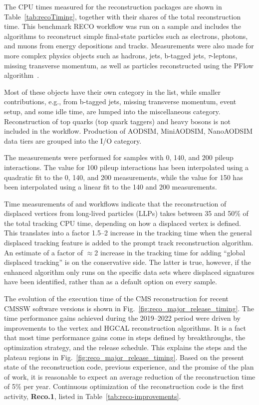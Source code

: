 The \gls{CPU} times measured for the \PhaseTwo reconstruction packages are shown in Table~\ref{tab:recoTiming}, together with their shares of the total reconstruction time. This benchmark \gls{RECO} workflow was run on a \ttbar sample and includes the algorithms to reconstruct simple final-state particles such as electrons, photons, and muons from energy depositions and tracks. Measurements were also made for more complex physics objects such as hadrons, jets, b-tagged jets, $\tau$-leptons, missing transverse momentum, as well as particles reconstructed using the \gls{PFlow} algorithm~\cite{CMS:2017yfk}.

Most of these objects have their own category in the list, while smaller contributions, e.g., from b-tagged jets, missing transverse momentum, event setup, and some idle time, are lumped into the miscellaneous category. Reconstruction of top quarks (top quark taggers) and heavy bosons is not included in the workflow. Production of \gls{AOD}\gls{SIM}, Mini\gls{AOD}\gls{SIM}, Nano\gls{AOD}\gls{SIM} data tiers are grouped into the I/O category.

The measurements were performed for samples with 0, 140, and 200 pileup interactions. The value for 100 pileup interactions has been interpolated using a quadratic fit to the 0, 140, and 200 measurements, while the value for 150 has been interpolated using a linear fit to the 140 and 200 measurements.

Time measurements of \RunTwo and \RunThree workflows indicate that the reconstruction of displaced vertices from long-lived particles (LLPs) takes between 35 and 50\% of the total tracking \gls{CPU} time, depending on how a displaced vertex is defined. This translates into a factor 1.5--2 increase in the tracking time when the general displaced tracking feature is added to the prompt track reconstruction algorithm. An estimate of a factor of $\approx$2 increase in the \PhaseTwo tracking time for adding ``global displaced tracking'' is on the conservative side. The latter is true, however, if the enhanced algorithm only runs on the specific data sets where displaced signatures have been identified, rather than as a default option on every sample.

The evolution of the execution time of the \PhaseTwo CMS reconstruction for recent \gls{CMSSW} software versions is shown in Fig.~\ref{fig:reco_major_release_timing}. The time performance gains achieved during the 2019--2022 period were driven by improvements to the vertex and \gls{HGCAL} reconstruction algorithms. It is a fact that most time performance gains come in steps defined by breakthroughs, the optimization strategy, and the release schedule. This explains the steps and the plateau regions in Fig.~\ref{fig:reco_major_release_timing}. Based on the present state of the \PhaseTwo reconstruction code, previous experience, and the promise of the plan of work, it is reasonable to expect an average reduction of the \PhaseTwo reconstruction time of 5\% per year. Continuous optimization of the reconstruction code is the first activity, \textbf{Reco.1}, listed in Table~\ref{tab:reco-improvements}. 

